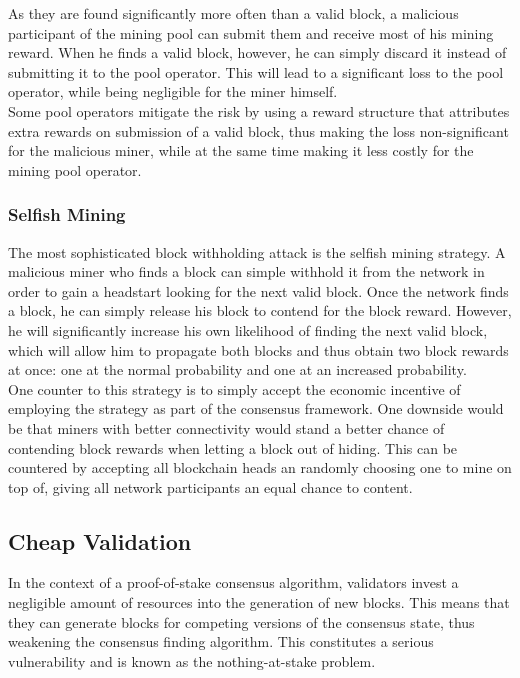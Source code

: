 \documentclass[12pt,a4paper]{article}
\begin{document}
As they are found significantly more often than a valid block, a malicious participant of the mining pool can submit them and receive most of his mining reward. When he finds a valid block, however, he can simply discard it instead of submitting it to the pool operator. This will lead to a significant loss to the pool operator, while being negligible for the miner himself.\\

Some pool operators mitigate the risk by using a reward structure that attributes extra rewards on submission of a valid block, thus making the loss non-significant for the malicious miner, while at the same time making it less costly for the mining pool operator.\\

\subsubsection{Selfish Mining}

The most sophisticated block withholding attack is the selfish mining strategy. A malicious miner who finds a block can simple withhold it from the network in order to gain a headstart looking for the next valid block. Once the network finds a block, he can simply release his block to contend for the block reward. However, he will significantly increase his own likelihood of finding the next valid block, which will allow him to propagate both blocks and thus obtain two block rewards at once: one at the normal probability and one at an increased probability.\\

One counter to this strategy is to simply accept the economic incentive of employing the strategy as part of the consensus framework. One downside would be that miners with better connectivity would stand a better chance of contending block rewards when letting a block out of hiding. This can be countered by accepting all blockchain heads an randomly choosing one to mine on top of, giving all network participants an equal chance to content.\\

\subsection{Cheap Validation}

In the context of a proof-of-stake consensus algorithm, validators invest a negligible amount of resources into the generation of new blocks. This means that they can generate blocks for competing versions of the consensus state, thus weakening the consensus finding algorithm. This constitutes a serious vulnerability and is known as the nothing-at-stake problem.\\
\end{document}
